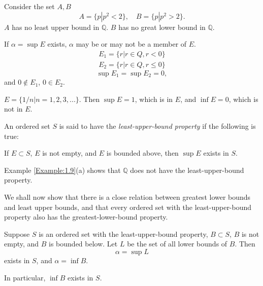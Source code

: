 \begin{myExample}
    \label{Example:1.9}
    \begin{asparaenum}[(a)]
        \item Consider the set $A, B$
        \begin{equation*}
            A = \{p|p^2 < 2\},\quad
            B = \{p|p^2 > 2\}.
        \end{equation*}
        $A$ has no least upper bound in $\mathbb{Q}$.
        $B$ has no great lower bound in $\mathbb{Q}$.    
        \item If $\alpha = \sup E$ exists, $\alpha$ may be or may not be a member of $E$.
        \begin{align*}
            E_1 = \{r |r\in Q, r < 0\}\\
            E_2 = \{r |r\in Q, r \leq 0\}
        \end{align*}
        \begin{equation*}
            \sup E_1 = \sup E_2 = 0,
        \end{equation*}
        and $0\not\in E_1$, $0\in E_2$.
        \item $E = \{1/n | n = 1,2,3,...\}$. Then $\sup E = 1$, which is in $E$, and $\inf E = 0$, which is not in $E$.
    \end{asparaenum}
\end{myExample}

\begin{myDef}\label{myDef:1.10}
{\color{red}{least-upper-bound property}}

An ordered set $S$ is said to have the \emph{least-upper-bound property}
if the following is true:

If $E \subset S$, $E$ is not empty, and $E$ is bounded above, then $\sup E$ exists in $S$.
\end{myDef}

Example \ref{Example:1.9}(a) shows that $\mathbb{Q}$ does not have the least-upper-bound property.

We shall now show that there is a close relation between greatest lower
bounds and least upper bounds, and that every ordered set with the least-upper-bound property also has the greatest-lower-bound property.

\begin{thm}\label{thm:1.11}
Suppose $S$ is an ordered set with the least-upper-bound property,
$B \subset S$, $B$ is not empty, and $B$ is bounded below. Let $L$ be the set of all lower
bounds of $B$. Then
\begin{equation*}
    \alpha = \sup L
\end{equation*}
exists in $S$, and $\alpha = \inf B$.

In particular, $\inf B$ exists in $S$.
\end{thm}

